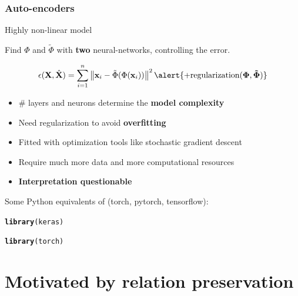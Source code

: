 \documentclass{beamer}\usepackage[]{graphicx}\usepackage[]{color}
\makeatletter
\newcommand{\hlstd}[1]{\textcolor[rgb]{0.345,0.345,0.345}{#1}}%
\newcommand{\hlkwd}[1]{\textcolor[rgb]{0.737,0.353,0.396}{\textbf{#1}}}%
\newenvironment{kframe}{%
 \def\at@end@of@kframe{}%
 \ifinner\ifhmode%
  \def\at@end@of@kframe{\end{minipage}}%
  \begin{minipage}{\columnwidth}%
 \fi\fi%
 \def\FrameCommand##1{\hskip\@totalleftmargin \hskip-\fboxsep
 \colorbox{shadecolor}{##1}\hskip-\fboxsep
     \hskip-\linewidth \hskip-\@totalleftmargin \hskip\columnwidth}%
 \MakeFramed {\advance\hsize-\width
   \@totalleftmargin\z@ \linewidth\hsize
   \@setminipage}}%
 {\par\unskip\endMakeFramed%
 \at@end@of@kframe}
\newenvironment{knitrout}{}{} %
\makeatother
\begin{document}
\begin{frame}
   \frametitle{Auto-encoders}
   
   \begin{block}{Highly non-linear model}

      Find $\Phi$ and $\tilde\Phi$ with \alert{\bf two} neural-networks, controlling the error.

      \begin{equation*}
        \epsilon(\bX, \hat \bX ) = \sum_{i=1}^n \left\| \bx_i - \tilde{\Phi}(\Phi(\bx_i)) \right\|^2 \alert{\bf + \text{regularization}(\Phi, \tilde\Phi)}
      \end{equation*}

      \begin{itemize}
         \item \# layers and neurons determine the \alert{\bf model complexity}
         \item Need regularization to avoid \alert{\bf overfitting}
         \item  Fitted with optimization tools like stochastic gradient descent
         \item Require much \alert{more data} and more computational \alert{resources}
         \item \alert{\bf Interpretation questionable}
      \end{itemize}

   \end{block}

Some Python equivalents of (torch, pytorch, tensorflow):
 
\begin{knitrout}\scriptsize
{}\color{fgcolor}\begin{kframe}
\begin{alltt}
\hlkwd{library}\hlstd{(keras)}

\hlkwd{library}\hlstd{(torch)}
\end{alltt}
\end{kframe}
\end{knitrout}

\end{frame}


\section{Motivated by relation preservation}
\end{document}
